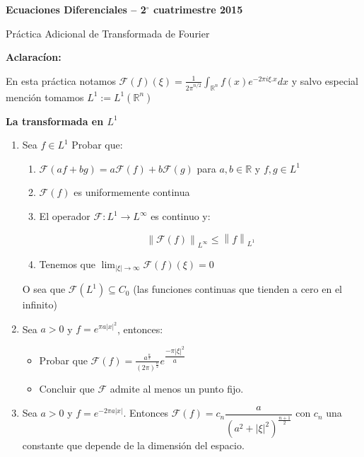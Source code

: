 \documentclass[11pt]{article}
\newcommand{\R}{{\mathbb{R}}}
\newcommand\norm[1]{\left\lVert#1\right\rVert}
\newcommand{\F}{\mathcal{F}}
\begin{document}
\pagestyle{empty}
\pagestyle{fancy}
\fancyfoot[CO]{\slshape \thepage}
\renewcommand{\headrulewidth}{0pt}


\centerline{\bf Ecuaciones Diferenciales -- 2$^\circ$
cuatrimestre 2015}
\centerline{\sc Pr\'actica Adicional de Transformada de Fourier}

\bigskip

\textbf{Aclarac\'ion:}

En esta pr\'actica notamos $\F(f)(\xi) = \frac{1}{{2\pi}^{n/2}} \int_{\R^n}{f(x)e^{-2\pi i \xi.x}dx}$ y salvo especial menci\'on tomamos $L^1 := L^1(\R^n)$

\medskip 

\textbf{La transformada en $L^1$}

\begin{enumerate}

\item Sea $f \in L^1$ Probar que:

\begin{enumerate}

\item $\F(af+bg)=a\F(f) + b \F(g)$ para $a,b \in \R$ y $f,g \in L^1$

\item $\F(f)$ es uniformemente continua

\item El operador $\F : L^1 \rightarrow L^{\infty}$ es continuo y:

$$\norm{\F(f)}_{L^{\infty}} \leq \norm{f}_{L^1}$$

\item Tenemos que $\lim_{|\xi|\rightarrow \infty} \F(f)(\xi) = 0$

\end{enumerate}

O sea que $\F(L^1) \subseteq C_0$ (las funciones continuas que tienden a cero en el infinito)

\item Sea $a>0$ y $f = e^{\pi a |x|^2}$, entonces:

\begin{itemize}
\item Probar que $\F(f) = \frac{a^{\frac{n}{2}}}{(2 \pi) ^{\frac{n}{2}}} e^{\dfrac{-\pi |\xi|^2}{a}}$
\item Concluir que $\F$ admite al menos un punto fijo.
\end{itemize}

\item Sea $a>0$ y $f=e^{-2\pi a |x|}$. Entonces $\F(f) = c_n \dfrac{a}{ (a^2 + |\xi|^2)^{\frac{n+1}{2}} }$ con $c_n$ una constante que depende de la dimensi\'on del espacio.


\end{enumerate}
\end{document}
